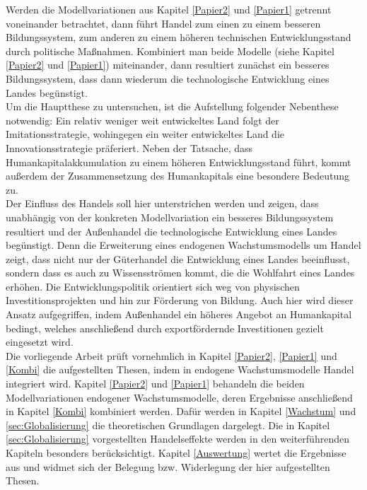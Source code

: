 %
Werden die Modellvariationen aus  Kapitel \ref{Papier2} und \ref{Papier1} getrennt voneinander betrachtet, dann führt Handel zum einen zu einem besseren Bildungssystem, zum anderen zu einem höheren technischen Entwicklungsstand durch politische Maßnahmen. Kombiniert man beide Modelle (siehe Kapitel \ref{Papier2} und \ref{Papier1}) miteinander, dann resultiert zunächst ein besseres Bildungssystem, dass dann wiederum die technologische Entwicklung eines Landes begünstigt. \\
%
Um die Hauptthese zu untersuchen, ist die Aufstellung folgender Nebenthese notwendig: Ein relativ weniger weit entwickeltes Land folgt der Imitationsstrategie, wohingegen ein weiter entwickeltes Land die Innovationsstrategie präferiert. Neben der Tatsache, dass Humankapitalakkumulation zu einem höheren Entwicklungsstand führt, kommt außerdem der Zusammensetzung des Humankapitals eine besondere Bedeutung zu. \\
%
Der Einfluss des Handels soll hier unterstrichen werden und zeigen, dass unabhängig von der konkreten Modellvariation ein besseres Bildungssystem resultiert und der Außenhandel die technologische Entwicklung eines Landes begünstigt.
Denn die Erweiterung eines endogenen Wachstumsmodells um Handel zeigt, dass nicht nur der Güterhandel die Entwicklung eines Landes beeinflusst, sondern dass es auch zu Wissensströmen kommt, die die Wohlfahrt eines Landes erhöhen.
Die Entwicklungspolitik orientiert sich weg von physischen Investitionsprojekten und hin zur Förderung von Bildung. Auch hier wird dieser Ansatz aufgegriffen, indem Außenhandel ein höheres Angebot an Humankapital bedingt, welches anschließend durch exportfördernde Investitionen gezielt eingesetzt wird. \\
%
Die vorliegende Arbeit prüft vornehmlich in Kapitel \ref{Papier2}, \ref{Papier1} und \ref{Kombi} die aufgestellten Thesen, indem in endogene Wachstumsmodelle Handel integriert wird. Kapitel \ref{Papier2} und \ref{Papier1} behandeln die beiden Modellvariationen endogener Wachstumsmodelle, deren Ergebnisse anschließend in Kapitel \ref{Kombi} kombiniert werden. Dafür werden in Kapitel \ref{Wachstum} und \ref{sec:Globalisierung} die theoretischen Grundlagen dargelegt. Die in Kapitel \ref{sec:Globalisierung} vorgestellten Handelseffekte werden in den weiterführenden Kapiteln besonders berücksichtigt. Kapitel \ref{Auswertung} wertet die Ergebnisse aus und widmet sich der Belegung bzw. Widerlegung der hier aufgestellten Thesen.